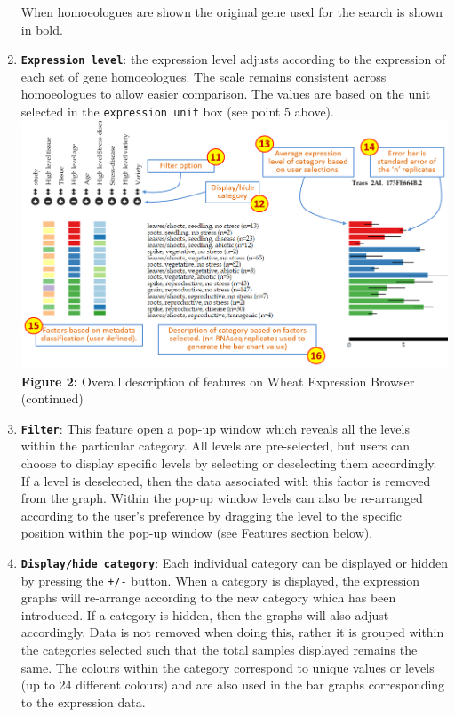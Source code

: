 \begin{enumerate}
  When homoeologues are shown the original gene used for the search is
  shown in bold.
\item
  \textbf{\lstinline!Expression level!}: the expression level adjusts
  according to the expression of each set of gene homoeologues. The
  scale remains consistent across homoeologues to allow easier
  comparison. The values are based on the unit selected in the
  \lstinline!expression unit! box (see point 5 above).
  \includegraphics{images/Figure2.png} \textbf{Figure 2:} Overall
  description of features on Wheat Expression Browser (continued)
\item
  \textbf{\lstinline!Filter!}: This feature open a pop-up window which
  reveals all the levels within the particular category. All levels are
  pre-selected, but users can choose to display specific levels by
  selecting or deselecting them accordingly. If a level is deselected,
  then the data associated with this factor is removed from the graph.
  Within the pop-up window levels can also be re-arranged according to
  the user's preference by dragging the level to the specific position
  within the pop-up window (see Features section below).
\item
  \textbf{\lstinline!Display/hide category!}: Each individual category
  can be displayed or hidden by pressing the \lstinline!+/-! button.
  When a category is displayed, the expression graphs will re-arrange
  according to the new category which has been introduced. If a category
  is hidden, then the graphs will also adjust accordingly. Data is not
  removed when doing this, rather it is grouped within the categories
  selected such that the total samples displayed remains the same. The
  colours within the category correspond to unique values or levels (up
  to 24 different colours) and are also used in the bar graphs
  corresponding to the expression data.\\

\end{enumerate}
